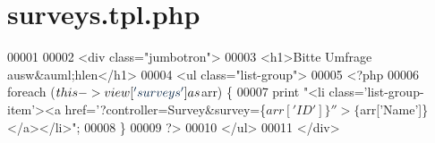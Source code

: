\hypertarget{surveys_8tpl_8php}{\section{surveys.\-tpl.\-php}
\label{surveys_8tpl_8php}
}

\begin{DoxyCode}
00001       
00002       <div \textcolor{keyword}{class}=\textcolor{stringliteral}{"jumbotron"}>
00003         <h1>Bitte Umfrage ausw&auml;hlen</h1>
00004                 <ul \textcolor{keyword}{class}=\textcolor{stringliteral}{"list-group"}>
00005                         <?php 
00006                         \textcolor{keywordflow}{foreach} ($this->view[\textcolor{stringliteral}{'surveys'}] as $arr) \{
00007                                 print \textcolor{stringliteral}{"<li class='list-group-item'><a
       href='?controller=Survey&survey=\{$arr['ID']\}''>\{$arr['Name']\}</a></li>"};      
00008                         \}
00009                         ?>
00010                 </ul>
00011       </div>
\end{DoxyCode}
